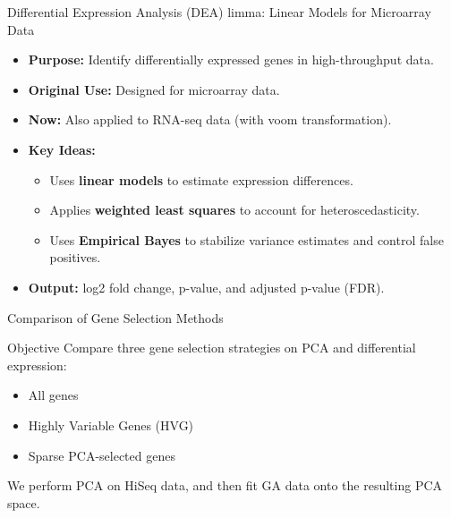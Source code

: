 \documentclass[12pt, aspectratio=43]{beamer}
\begin{document}
	\begin{frame}{Differential Expression Analysis (DEA)}
		limma: Linear Models for Microarray Data
	
	\begin{itemize}
		\item \textbf{Purpose:} Identify differentially expressed genes in high-throughput data.
		\item \textbf{Original Use:} Designed for microarray data.
		\item \textbf{Now:} Also applied to RNA-seq data (with voom transformation).
		\item \textbf{Key Ideas:}
		\begin{itemize}
			\item Uses \textbf{linear models} to estimate expression differences.
			\item Applies \textbf{weighted least squares} to account for heteroscedasticity.
			\item Uses \textbf{Empirical Bayes} to stabilize variance estimates and control false positives.
		\end{itemize}
		\item \textbf{Output:} log2 fold change, p-value, and adjusted p-value (FDR).
	\end{itemize}
	
	\end{frame}
	
		
	\begin{frame}{Comparison of Gene Selection Methods}
		
		\begin{block}{Objective}
			Compare three gene selection strategies on PCA and differential expression:
			\begin{itemize}
				\item All genes
				\item Highly Variable Genes (HVG)
				\item Sparse PCA-selected genes
			\end{itemize}
			We perform PCA on HiSeq data, and then fit GA data onto the resulting PCA space.
		\end{block}
		
		\end{frame}
		
\end{document}
